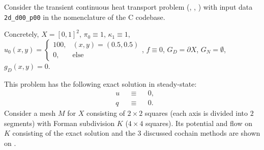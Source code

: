 \begin{example}
  Consider the transient continuous heat transport problem
  (,
   ,
   )
  with input data \verb|2d_d00_p00| in the nomenclature of the C codebase.

  Concretely,
    $X = [0, 1]^2$,
    $\pi_0 \equiv 1$,
    $\kappa_1 \equiv 1$,
    $u_0(x, y) =
      \begin{cases}
        100, & (x, y) = (0.5, 0.5) \\
        0, & \text{else}
      \end{cases}$,
    $f \equiv 0$,
    $G_D = \partial X$,
    $G_N = \emptyset$,
    $g_D(x, y) = 0$.

  This problem has the following exact solution in steady-state:
  \begin{subequations}
    \begin{alignat}{3}
      & u && \equiv && 0, \\
      & q && \equiv && 0.
    \end{alignat}
  \end{subequations}
  Consider a mesh $M$ for $X$ consisting of $2 \times 2$ squares (each axis is
  divided into $2$ segments) with Forman subdivision $K$ ($4 \times 4$ squares).
  Its potential and flow on $K$ consisting of the exact solution and the $3$
  discussed cochain methods are shown on
  .
\end{example}
